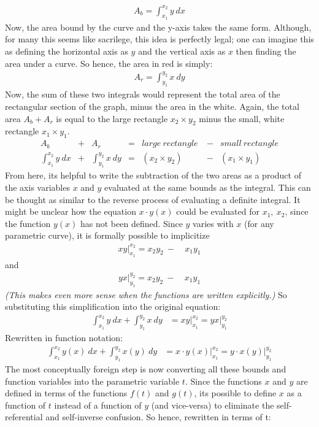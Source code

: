 \documentclass[11pt,a4paper]{article}
\begin{document}
\begin{align*}
A_b = \int_{x_1}^{x_2} y\ dx
\end{align*}
Now, the area bound by the curve and the y-axis takes the same form.  Although, for many this seems like sacrilege, this idea is perfectly legal; one can imagine this as defining the horizontal axis as $y$ and the vertical axis as $x$ then finding the area under a curve.  So hence, the area in red is simply:
\begin{align*}
A_r = \int_{y_1}^{y_2} x \ dy
\end{align*}
Now, the sum of these two integrals would represent the total area of the rectangular section of the graph,  minus the area in the white. Again,  the total area $A_b + A_r$ is equal to the large rectangle $x_2 \times y_2$ minus the small, white rectangle $x_1 \times y_1$.
\begin{align*}
A_b &+ &A_r &= &large\ rectangle\ &- &small\ rectangle \\
\int_{x_1}^{x_2} y \ dx &+ &\int_{y_1}^{y_2} x \ dy &= &( x_2 \times y_2)\ \ & - &(x_1 \times y_1)
\end{align*}
From here, its helpful to write the subtraction of the two areas as a product of the axis variables $x$ and $y$ evaluated at the same bounds as the integral. This can be thought as similar to the reverse process of evaluating a definite integral. It might be unclear how the equation $x \cdot y(x)$ could be evaluated for $x_1 ,\ x_2$, since the function $y(x)$ has not been defined. Since $y$ varies with $x$ (for any parametric curve), it is formally possible to implicitize 
\begin{align*}
xy \Big|_{x_1}^{x_2} =  x_2 y_2\ -\ & x_1 y_1
\end{align*}
and
\begin{align*}
yx \Big|_{y_1}^{y_2} =  x_2 y_2\ -\ & x_1 y_1
\end{align*}
\textit{(This makes even more sense when the functions are written explicitly.)} So substituting this simplification into the original equation:
\begin{align*}
\int_{x_1}^{x_2} y \ dx + \int_{y_1}^{y_2} x \ dy &= xy \Big|_{x_1}^{x_2} = yx \Big|_{y_1}^{y_2} 
\end{align*}
Rewritten in function notation:
\begin{align*}
\int_{x_1}^{x_2} y(x) \ dx + \int_{y_1}^{y_2} x(y) \ dy &= x \cdot y(x) \Big|_{x_1}^{x_2} = y\cdot x(y) \Big|_{y_1}^{y_2}
\end{align*}
The most conceptually foreign step is now converting all these bounds and function variables into the parametric variable $t$.  Since the functions $x$ and $y$ are defined in terms of the functions $f(t)$ and $g(t)$,  its possible to define $x$ as a function of $t$ instead of a function of $y$ (and vice-versa) to eliminate the self-referential and self-inverse confusion.  So hence, rewritten in terms of t:
\end{document}
